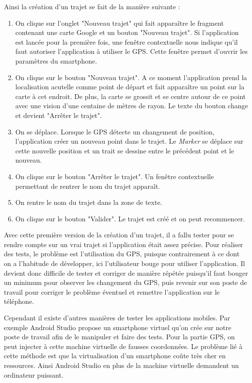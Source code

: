 Ainsi la création d'un trajet se fait de la manière suivante :
\begin{enumerate}
  \item On clique sur l'onglet "Nouveau trajet" qui fait apparaître le fragment contenant une carte Google et un bouton "Nouveau trajet".
  Si l'application est lancée pour la première fois, une fenêtre contextuelle nous indique qu'il faut autoriser l'application à utiliser le GPS.
  Cette fenêtre permet d'ouvrir les paramètres du smartphone.
  \item On clique sur le bouton "Nouveau trajet". A ce moment l'application prend la localisation acutelle comme point de départ et fait
  apparaître un point sur la carte à cet endroit. De plus, la carte se grossit et se centre autour de ce point avec une vision d'une centaine de mètres de rayon. Le texte du bouton change et devient "Arrêter le trajet".
  \item On se déplace. Lorsque le GPS détecte un changement de position, l'application créer un nouveau point dans le trajet. Le \emph{Marker}
  se déplace sur cette nouvelle position et un trait se dessine entre le précédent point et le nouveau.
  \item On clique sur le bouton "Arrêter le trajet". Un fenêtre contextuelle permettant de rentrer le nom du trajet apparaît.
  \item On rentre le nom du trajet dans la zone de texte.
  \item On clique sur le bouton "Valider". Le trajet est créé et on peut recommencer.
\end{enumerate}
\vspace{10pt}

Avec cette première version de la création d'un trajet, il a fallu tester pour se rendre compte sur un vrai trajet si l'application était
assez précise. Pour réaliser des tests, le problème est l'utilisation du GPS, puisque contrairement à ce dont on a l'habitude de développer,
ici l'utilisateur bouge pour utiliser l'application. Il devient donc difficile de tester et corriger de manière répétée puisqu'il faut bouger
un minimum pour observer les changement du GPS, puis revenir sur son poste de travail pour corriger le problème éventuel et remettre
l'application sur le téléphone.

Cependant il existe d'autres manières de tester les applications mobiles. Par exemple Android Studio propose
un smartphone virtuel qu'on crée sur notre poste de travail afin de le manipuler et faire des tests. Pour la partie GPS, on peut injecter
à cette machine virtuelle de fausses coordonnées. Le problème lié à cette méthode est que la virtualisation d'un smartphone coûte très cher
en ressources. Ainsi Android Studio en plus de la machine virtuelle demandent un ordinateur puissant.

